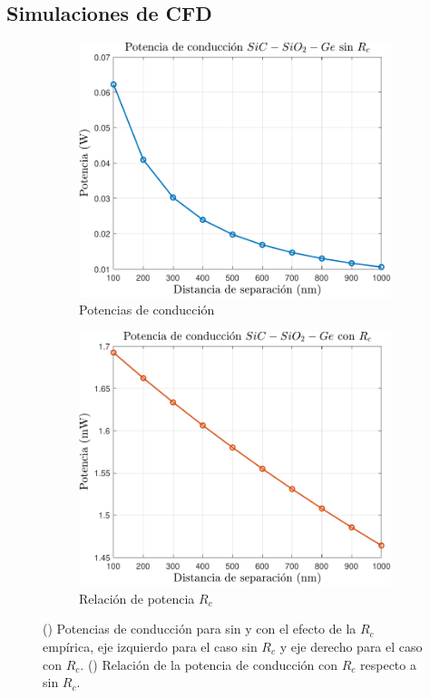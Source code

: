 \subsection{Simulaciones de CFD}
\graphicspath{ {./figuras/Resultados/conduccion/pdf/} }
\begin{figure}[H]
	\centering
	\begin{subfigure}[b]{0.49\textwidth}
		\centering
			\includegraphics[width=1.00\textwidth]{Pn_SiCSiO2Ge.pdf}
		\caption{Potencias de conducción}
		\label{fig:Prc_SiCSiO2Ge}
	\end{subfigure}
	\hfill
	\begin{subfigure}[b]{0.49\textwidth}
		\centering
			\includegraphics[width=1.00\textwidth]{Prc_SiCSiO2Ge.pdf}
		\caption{Relación de potencia $R_c$}
		\label{fig:relPrc_SiCSiO2Ge}
	\end{subfigure}
	\caption{() Potencias de conducción para sin y con el efecto de la $R_c$ empírica, eje izquierdo para el caso sin $R_c$ y eje derecho para el caso con $R_c$. () Relación de la potencia de conducción con $R_c$ respecto a sin $R_c$.}
	\label{fig:PrcCond_SiCSiO2Ge}
\end{figure}
